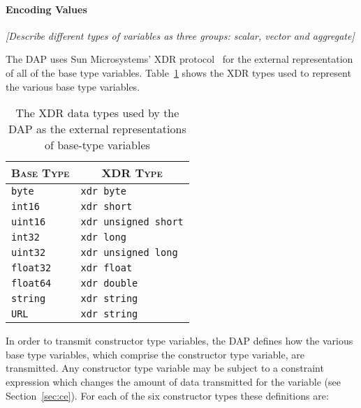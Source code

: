 \documentclass{article}
\begin{document}
\paragraph{Encoding Values}
\label{sec:rep-of-values}

\emph{[Describe different types of variables as three groups: scalar, vector
  and aggregate]}

The \ac{DAP} uses Sun Microsystems' XDR protocol~\cite{xdr} for the external
representation of all of the base type variables. Table~\ref{tab:base-xdr}
shows the XDR types used to represent the various base type
variables.

\begin{table}
\caption{The XDR data types used by the DAP as the external representations
  of base-type variables}
\label{tab:base-xdr}
\begin{center}
\begin{tabular}{|l|l|} \hline
\multicolumn{1}{|c}{\textsc{Base Type}} & \multicolumn{1}{c|}{\textsc{XDR Type}} \\
\hline \hline
\texttt{byte} & \texttt{xdr byte} \\ \hline
\texttt{int16} & \texttt{xdr short} \\ \hline
\texttt{uint16} & \texttt{xdr unsigned short} \\ \hline
\texttt{int32} & \texttt{xdr long} \\ \hline
\texttt{uint32} & \texttt{xdr unsigned long} \\ \hline
\texttt{float32} & \texttt{xdr float} \\ \hline
\texttt{float64} & \texttt{xdr double} \\ \hline
\texttt{string} & \texttt{xdr string} \\ \hline
\texttt{URL} & \texttt{xdr string} \\ \hline
\end{tabular}
\end{center}
\end{table}

In order to transmit constructor type variables, the \ac{DAP} defines how the
various base type variables, which comprise the constructor type variable,
are transmitted. Any constructor type variable may be subject to a constraint
expression which changes the amount of data transmitted for the variable (see
Section~\ref{sec:ce}). For each of the six constructor types these
definitions are:
\end{document}

